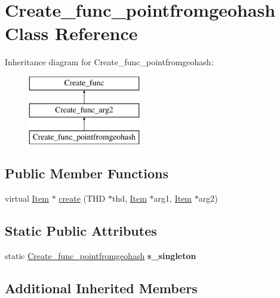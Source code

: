 \hypertarget{classCreate__func__pointfromgeohash}{}\section{Create\+\_\+func\+\_\+pointfromgeohash Class Reference}
\label{classCreate__func__pointfromgeohash}
Inheritance diagram for Create\+\_\+func\+\_\+pointfromgeohash\+:\begin{figure}[H]
\begin{center}
\leavevmode
\includegraphics[height=3.000000cm]{classCreate__func__pointfromgeohash}
\end{center}
\end{figure}
\subsection*{Public Member Functions}
\begin{DoxyCompactItemize}
\item 
virtual \mbox{\hyperlink{classItem}{Item}} $\ast$ \mbox{\hyperlink{classCreate__func__pointfromgeohash_a1e70feff0da42c163a804c64e1985de1}{create}} (T\+HD $\ast$thd, \mbox{\hyperlink{classItem}{Item}} $\ast$arg1, \mbox{\hyperlink{classItem}{Item}} $\ast$arg2)
\end{DoxyCompactItemize}
\subsection*{Static Public Attributes}
\begin{DoxyCompactItemize}
\item 
\mbox{\label{classCreate__func__pointfromgeohash_ab0b24fd033c1cca019ab2bbd8e7ab961}} 
static \mbox{\hyperlink{classCreate__func__pointfromgeohash}{Create\+\_\+func\+\_\+pointfromgeohash}} {\bfseries s\+\_\+singleton}
\end{DoxyCompactItemize}
\subsection*{Additional Inherited Members}



